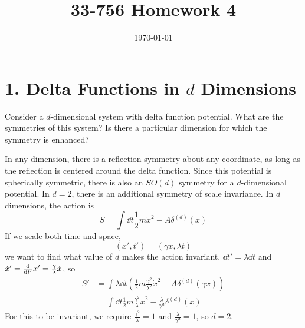 \documentclass[a4paper,twoside]{article}
\title{33-756 Homework 4}
\date{\today}
\begin{document}
\maketitle

\section*{1. Delta Functions in $ d $ Dimensions}
Consider a $ d $-dimensional system with delta function potential. What are the symmetries of this system? Is there a particular dimension for which the symmetry is enhanced?
\begin{problem}
    In any dimension, there is a reflection symmetry about any coordinate, as long as the reflection is centered around the delta function. Since this potential is spherically symmetric, there is also an $ SO(d) $ symmetry for a $ d $-dimensional potential. In $ d = 2 $, there is an additional symmetry of scale invariance. In $ d $ dimensions, the action is
    \begin{equation}
        S = \int \dd{t} \frac{1}{2} m\dot{x}^2 - A \delta^{(d)}(x)
    \end{equation}
    If we scale both time and space,
    \begin{equation}
        (x', t') = (\gamma x, \lambda t)
    \end{equation}
    we want to find what value of $ d $ makes the action invariant. $ \dd{t'} = \lambda \dd{t} $ and $ \dot{x}' = \dv{t'}x' = \frac{\gamma}{\lambda} \dot{x} $, so
    \begin{align}
        S' &= \int \lambda \dd{t} \left( \frac{1}{2} m \frac{\gamma^2}{\lambda^2} \dot{x}^2 - A \delta^{(d)}(\gamma x) \right) \\
        &= \int \dd{t} \frac{1}{2} m \frac{\gamma^2}{\lambda} \dot{x}^2 - \frac{\lambda}{\gamma^d} \delta^{(d)}(x) 
    \end{align}
    For this to be invariant, we require $ \frac{\gamma^2}{\lambda} = 1 $ and $ \frac{\lambda}{\gamma^d} = 1 $, so $ d = 2 $.
\end{problem}
\end{document}
